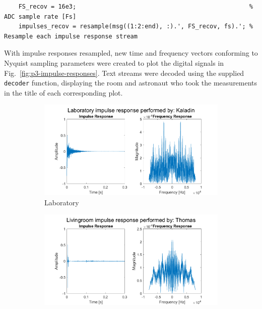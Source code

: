 \documentclass[12pt]{article}
\numberwithin{equation}{section}
\numberwithin{figure}{section}
\numberwithin{table}{section}
\begin{document}
\begin{verbatim}
    FS_recov = 16e3;                                                % ADC sample rate [Fs]
    impulses_recov = resample(msg((1:2:end), :).', FS_recov, fs).'; % Resample each impulse response stream
\end{verbatim}

With impulse responses resampled, new time and frequency vectors conforming to
Nyquist sampling parameters were created to plot the digital signals in
Fig.~\ref{fig:p3-impulse-responses}. Text streams were decoded using the
supplied \verb+decoder+ function, displaying the room and astronaut who took
the measurements in the title of each corresponding plot.

\begin{figure}[ht]
    \centering
    \begin{subfigure}{0.5\textwidth}
        \centering
        \includegraphics[width=\textwidth]{figures/p3-lab.png}
        \caption{Laboratory\label{fig:p3-lab}}
    \end{subfigure}%
    \begin{subfigure}{0.5\textwidth}
        \centering
        \includegraphics[width=\textwidth]{figures/p3-livingroom.png}

\end{subfigure}
\end{figure}
\end{document}
